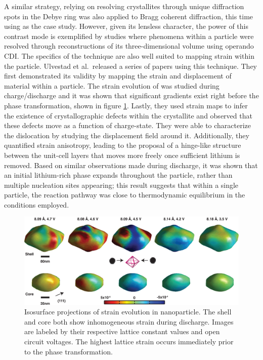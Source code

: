 \documentclass[journal=cmatex,manuscript=perspective]{achemso}
\begin{document}
A similar strategy, relying on resolving crystallites through unique
diffraction spots in the Debye ring was also applied to Bragg coherent
diffraction, this time using  as the case
study\cite{singer2014}. However, given its lensless character, the
power of this contrast mode is exemplified by studies where phenomena
within a particle were resolved through reconstructions of its
three-dimensional volume using operando CDI. The specifics of the
technique are also well suited to mapping strain within the
particle. Ulvestad et al.\ released a series of papers using this
technique. They first demonstrated its validity by mapping the strain
and displacement of material within a particle\cite{ulvestad2014}. The
strain evolution of  was studied during
charge/discharge and it was shown that significant gradients exist
right before the phase transformation, shown in figure
\ref{figure:ulvestad2014-2}\cite{ulvestad2014-2}. Lastly, they used
strain maps to infer the existence of crystallographic defects within
the crystallite and observed that these defects move as a function of
charge-state\cite{ulvestad2015}. They were able to characterize the
dislocation by studying the displacement field around
it. Additionally, they quantified strain anisotropy, leading to the
proposal of a hinge-like structure between the unit-cell layers that
moves more freely once sufficient lithium is removed. Based on similar
observations made during discharge, it was shown that an initial
lithium-rich phase expands throughout the particle, rather than
multiple nucleation sites appearing; this result suggests that within
a single particle, the reaction pathway was close to thermodynamic
equilibrium in the conditions employed.

\begin{figure}
  \includegraphics[width=\textwidth]{ulvestad2014-2}
  \caption{Isosurface projections of strain evolution in
     nanoparticle. The shell and core both
    show inhomogeneous strain during discharge. Images are labeled by
    their respective lattice constant values and open circuit
    voltages. The highest lattice strain occurs immediately prior to
    the phase transformation.\cite{ulvestad2014-2}}
  \label{figure:ulvestad2014-2}
\end{figure}
\end{document}
